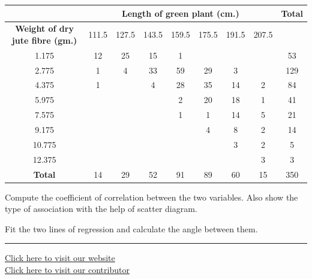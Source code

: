 \documentclass[11pt,a4paper]{article}
\begin{document}
\begin{center}
\small

\begin{tabular}{|c|c|c|c|c|c|c|c|c|}
\hline
& \multicolumn{7}{|c|}{   \textbf{Length of green plant (cm.)}} &   \textbf{Total} \\ \hline
   \textbf{Weight of dry jute fibre (gm.)} & 111.5 & 127.5 & 143.5 & 159.5 & 175.5 & 191.5 & 207.5 & \\ \hline
1.175 & 12 & 25 & 15 & 1 & & & & 53 \\ \hline
2.775 & 1 & 4 & 33 & 59 & 29 & 3 & & 129 \\ \hline
4.375 & 1 & & 4 & 28 & 35 & 14 & 2 & 84 \\ \hline
5.975 & & & & 2 & 20 & 18 & 1 & 41 \\ \hline
7.575 & & & & 1 & 1 & 14 & 5 & 21 \\ \hline
9.175 & & & & & 4 & 8 & 2 & 14 \\ \hline
10.775 & & & & & & 3 & 2 & 5 \\ \hline
12.375 & & & & & & & 3 & 3 \\ \hline
   \textbf{Total} & 14 & 29 & 52 & 91 & 89 & 60 & 15 & 350 \\ \hline
\end{tabular}
\end{center}


\begin{parts}
  \item Compute the coefficient of correlation between the two variables. Also show the type of association with the help of scatter diagram.
  \item Fit the two lines of regression and calculate the angle between them.
\end{parts}

\vfill
\rule{\linewidth}{0.4pt}

\begin{center}\small
\href{https://bhu-exam.vercel.app/}{Click here to visit our website}\\[4pt]
\href{https://me-aryan.vercel.app/}{Click here to visit our contributor}
\end{center}
\end{document}
